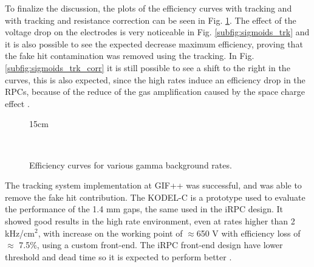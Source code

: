 To finalize the discussion, the plots of the efficiency curves with tracking and with tracking and resistance correction can be seen in Fig. \ref{fig:eff_curves}. The effect of the voltage drop on the electrodes is very noticeable in Fig. \ref{subfig:sigmoids_trk} and it is also possible to see the expected decrease maximum efficiency, proving that the fake hit contamination was removed using the tracking. In Fig. \ref{subfig:sigmoids_trk_corr} it is still possible to see a shift to the right in the curves, this is also expected, since the high rates induce an efficiency drop in the RPCs, because of the reduce of the gas amplification caused by the space charge effect \cite{Lippmann:2003yb}. 

\begin{figure}[!htm]{15cm}
  \caption{Efficiency curves for various gamma background rates.} 
  \label{fig:eff_curves}
  \hfill
  \\
\end{figure}

The tracking system implementation at GIF++ was successful, and was able to remove the fake hit contribution. The KODEL-C is a prototype used to evaluate the performance of the 1.4 mm gaps, the same used in the iRPC design. It showed good results in the high rate environment, even at rates higher than 2 kHz/cm$^2$, with increase on the working point of $\approx$650 V with efficiency loss of $\approx$ 7.5\%, using a custom front-end. The iRPC front-end design have lower threshold and dead time so it is expected to perform better \cite{CMS:2021bxv}.